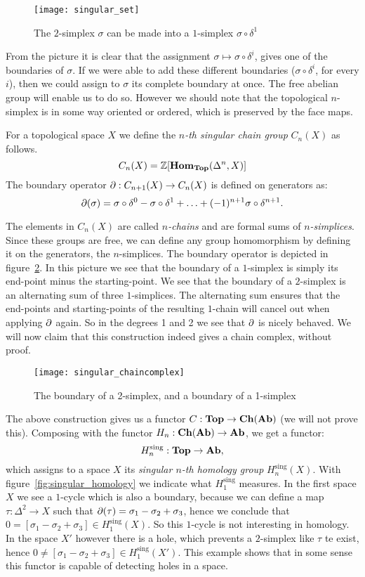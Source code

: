 \begin{figure}[h!]
	\texttt{[image: singular\_set]}
	\caption{The $2$-simplex $\sigma$ can be made into a $1$-simplex $\sigma \circ \delta^1$}
	\label{fig:diagram_d}
\end{figure}

From the picture it is clear that the assignment $\sigma \mapsto \sigma \circ \delta^i$, gives one of the boundaries of $\sigma$. If we were able to add these different boundaries ($\sigma \circ \delta^i$, for every $i$), then we could assign to $\sigma$ its complete boundary at once. The free abelian group will enable us to do so. However we should note that the topological $n$-simplex is in some way oriented or ordered, which is preserved by the face maps.

\begin{definition}
	For a topological space $X$ we define the \emph{$n$-th singular chain group} $C_n(X)$ as follows.
	$$ C_n(X) = \mathbb{Z}[\mathbf{Hom}_{\mathbf{Top}}(\Delta^n, X)] $$
	The boundary operator $\partial : C_{n+1}(X) \to C_n(X)$ is defined on generators as:
	$$ \partial(\sigma) = \sigma \circ \delta^0 - \sigma \circ \delta^1 + \ldots + (-1)^{n+1} \sigma \circ \delta^{n+1}.$$
\end{definition}

The elements in $C_n(X)$ are called \emph{$n$-chains} and are formal sums of \emph{$n$-simplices}. Since these groups are free, we can define any group homomorphism by defining it on the generators, the $n$-simplices. The boundary operator is depicted in figure~\ref{fig:singular_chaincomplex}. In this picture we see that the boundary of a $1$-simplex is simply its end-point minus the starting-point. We see that the boundary of a $2$-simplex is an alternating sum of three $1$-simplices. The alternating sum ensures that the end-points and starting-points of the resulting $1$-chain will cancel out when applying $\partial$ again. So in the degrees 1 and 2 we see that $\partial$ is nicely behaved. We will now claim that this construction indeed gives a chain complex, without proof.
\begin{figure}[h!]
	\texttt{[image: singular\_chaincomplex]}
	\caption{The boundary of a 2-simplex, and a boundary of a 1-simplex}
	\label{fig:singular_chaincomplex}
\end{figure}

The above construction gives us a functor $C: \mathbf{Top} \to \mathbf{Ch}(\mathbf{Ab})$ (we will not prove this). Composing with the functor $H_n: \mathbf{Ch}(\mathbf{Ab}) \to \mathbf{Ab}$, we get a functor:
$$ H^\text{sing}_n : \mathbf{Top} \to \mathbf{Ab}, $$
which assigns to a space $X$ its \emph{singular $n$-th homology group} $H^\text{sing}_n(X)$. With figure~\ref{fig:singular_homology} we indicate what $H^\text{sing}_1$ measures. In the first space $X$ we see a $1$-cycle which is also a boundary, because we can define a map $\tau: \Delta^2 \to X$ such that $\partial(\tau) = \sigma_1-\sigma_2+\sigma_3$, hence we conclude that $0 = [\sigma_1-\sigma_2+\sigma_3] \in H^\text{sing}_1(X)$. So this $1$-cycle is not interesting in homology. In the space $X'$ however there is a hole, which prevents a $2$-simplex like $\tau$ te exist, hence $0 \neq [\sigma_1-\sigma_2+\sigma_3] \in H^\text{sing}_1(X')$. This example shows that in some sense this functor is capable of detecting holes in a space.

